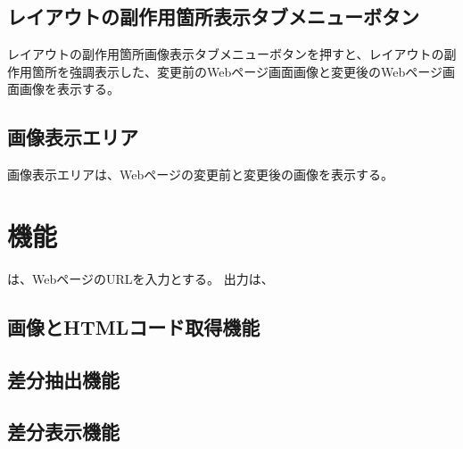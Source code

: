 \subsection{レイアウトの副作用箇所表示タブメニューボタン}\label{subsec:subeffect_tab}
レイアウトの副作用箇所画像表示タブメニューボタンを押すと、レイアウトの副作用箇所を強調表示した、変更前のWebページ画面画像と変更後のWebページ画面画像を表示する。


\subsection{画像表示エリア}\label{subsec:img_area}
画像表示エリアは、Webページの変更前と変更後の画像を表示する。


\section{機能}\label{sec:label_detection}
\toolName は、WebページのURLを入力とする。
出力は、


\subsection{画像とHTMLコード取得機能}\label{subsec:a1}


\subsection{差分抽出機能}\label{sec:a2}


\subsection{差分表示機能}\label{sec:a3}
